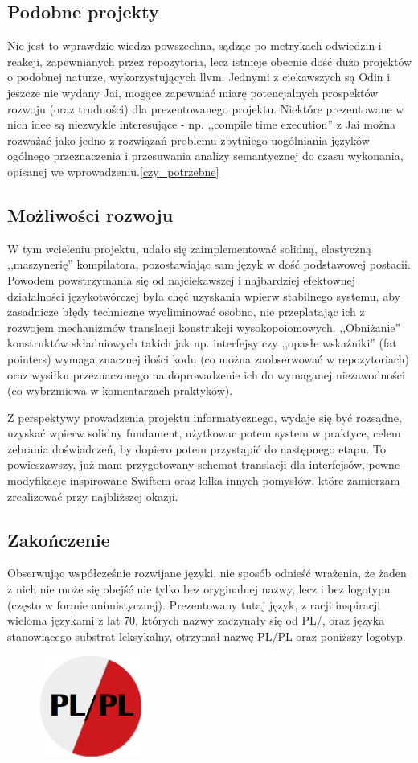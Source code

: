 \subsection{Podobne projekty}
Nie jest to wprawdzie wiedza powszechna, sądząc po metrykach odwiedzin i reakcji, zapewnianych przez repozytoria, lecz istnieje obecnie dość dużo projektów o podobnej naturze, wykorzystujących llvm. Jednymi z ciekawszych są Odin\cite{Odin} i jeszcze nie wydany Jai\cite{Jai}, mogące zapewniać miarę potencjalnych prospektów rozwoju (oraz trudności) dla prezentowanego projektu. Niektóre prezentowane w nich idee są niezwykle interesujące - np. ,,compile time execution'' z Jai można rozważać jako jedno z rozwiązań problemu zbytniego uogólniania języków ogólnego przeznaczenia i przesuwania analizy semantycznej do czasu wykonania, opisanej we wprowadzeniu.\ref{czy_potrzebne}

\subsection{Możliwości rozwoju}
W tym wcieleniu projektu, udało się zaimplementować solidną, elastyczną ,,maszynerię'' kompilatora, pozostawiając sam język w dość podstawowej postacii. Powodem powstrzymania się od najciekawszej i najbardziej efektownej działalności językotwórczej była chęć uzyskania wpierw stabilnego systemu, aby zasadnicze błędy techniczne wyeliminować osobno, nie przeplatając ich z rozwojem mechanizmów translacji konstrukcji wysokopoiomowych. ,,Obniżanie'' konstruktów składniowych takich jak np. interfejsy czy ,,opasłe wskaźniki'' (fat pointers) wymaga znacznej ilości kodu (co można zaobserwować w repozytoriach) oraz wysiłku przeznaczonego na doprowadzenie ich do wymaganej niezawodności (co wybrzmiewa w komentarzach praktyków).

Z perspektywy prowadzenia projektu informatycznego, wydaje się być rozsądne, uzyskać wpierw solidny fundament, użytkowac potem system w praktyce, celem zebrania doświadczeń, by dopiero potem przystąpić do następnego etapu. To powieszawszy, już mam przygotowany schemat translacji dla interfejsów, pewne modyfikacje inspirowane Swiftem oraz kilka innych pomysłów, które zamierzam zrealizować przy najbliższej okazji.

\subsection{Zakończenie}
Obserwując współcześnie rozwijane języki, nie sposób odnieść wrażenia, że żaden z nich nie może się obejść nie tylko bez oryginalnej nazwy, lecz i bez logotypu (często w formie animistycznej). Prezentowany tutaj język, z racji inspiracji wieloma językami z lat 70, których nazwy zaczynały się od PL/, oraz języka stanowiącego substrat leksykalny, otrzymał nazwę PL/PL oraz poniższy logotyp.

\begin{figure}[h]
    \centering
    \includegraphics[width=0.3\textwidth]{images/znaczek.png}
\end{figure}